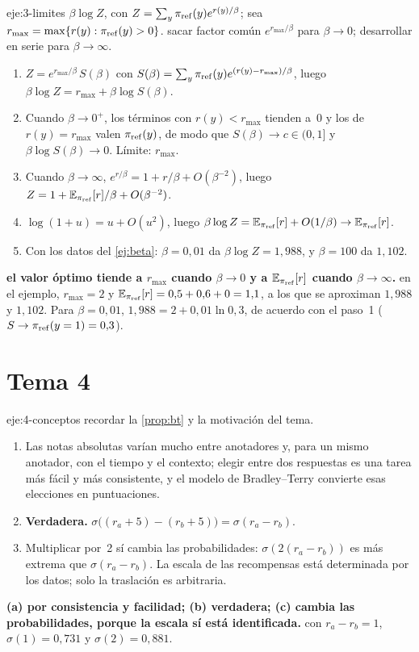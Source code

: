 \begin{solucion}{eje:3-limites}
\datos $\beta\log Z$, con $Z=\sum_y\pi_{\mathrm{ref}}(y)e^{r(y)/\beta}$; sea $r_{\max}=\max\{r(y):\pi_{\mathrm{ref}}(y)>0\}$.
\planteamiento sacar factor común $e^{r_{\max}/\beta}$ para $\beta\to 0$; desarrollar en serie para $\beta\to\infty$.
\pasos
\begin{enumerate}[label=\arabic*.]
  \item $Z=e^{r_{\max}/\beta}\,S(\beta)$ con $S(\beta)=\sum_y\pi_{\mathrm{ref}}(y)e^{(r(y)-r_{\max})/\beta}$, luego $\beta\log Z=r_{\max}+\beta\log S(\beta)$.
  \item Cuando $\beta\to 0^{+}$, los términos con $r(y)<r_{\max}$ tienden a~0 y los de $r(y)=r_{\max}$ valen $\pi_{\mathrm{ref}}(y)$, de modo que $S(\beta)\to c\in(0,1]$ y $\beta\log S(\beta)\to 0$. Límite: $r_{\max}$.
  \item Cuando $\beta\to\infty$, $e^{r/\beta}=1+r/\beta+O(\beta^{-2})$, luego $Z=1+\mathbb{E}_{\pi_{\mathrm{ref}}}[r]/\beta+O(\beta^{-2})$.
  \item $\log(1+u)=u+O(u^{2})$, luego $\beta\log Z=\mathbb{E}_{\pi_{\mathrm{ref}}}[r]+O(1/\beta)\to\mathbb{E}_{\pi_{\mathrm{ref}}}[r]$.
  \item Con los datos del \cref{ej:beta}: $\beta=0{,}01$ da $\beta\log Z=1{,}988$, y $\beta=100$ da $1{,}102$.
\end{enumerate}
\resultado \textbf{el valor óptimo tiende a $r_{\max}$ cuando $\beta\to 0$ y a $\mathbb{E}_{\pi_{\mathrm{ref}}}[r]$ cuando $\beta\to\infty$.}
\comprobacion en el ejemplo, $r_{\max}=2$ y $\mathbb{E}_{\pi_{\mathrm{ref}}}[r]=0{,}5+0{,}6+0=1{,}1$, a los que se aproximan $1{,}988$ y $1{,}102$. Para $\beta=0{,}01$, $1{,}988=2+0{,}01\ln 0{,}3$, de acuerdo con el paso~1 ($S\to\pi_{\mathrm{ref}}(y=1)=0{,}3$).
\end{solucion}

\section{Tema 4}

\begin{solucion}{eje:4-conceptos}
\planteamiento recordar la \cref{prop:bt} y la motivación del tema.
\pasos
\begin{enumerate}[label=(\alph*)]
  \item Las notas absolutas varían mucho entre anotadores y, para un mismo anotador, con el tiempo y el contexto; elegir entre dos respuestas es una tarea más fácil y más consistente, y el modelo de Bradley--Terry convierte esas elecciones en puntuaciones.
  \item \textbf{Verdadera.} $\sigma\bigl((r_a+5)-(r_b+5)\bigr)=\sigma(r_a-r_b)$.
  \item Multiplicar por~2 sí cambia las probabilidades: $\sigma(2(r_a-r_b))$ es más extrema que $\sigma(r_a-r_b)$. La escala de las recompensas está determinada por los datos; solo la traslación es arbitraria.
\end{enumerate}
\resultado \textbf{(a) por consistencia y facilidad; (b) verdadera; (c) cambia las probabilidades, porque la escala sí está identificada.}
\comprobacion con $r_a-r_b=1$, $\sigma(1)=0{,}731$ y $\sigma(2)=0{,}881$.
\end{solucion}


